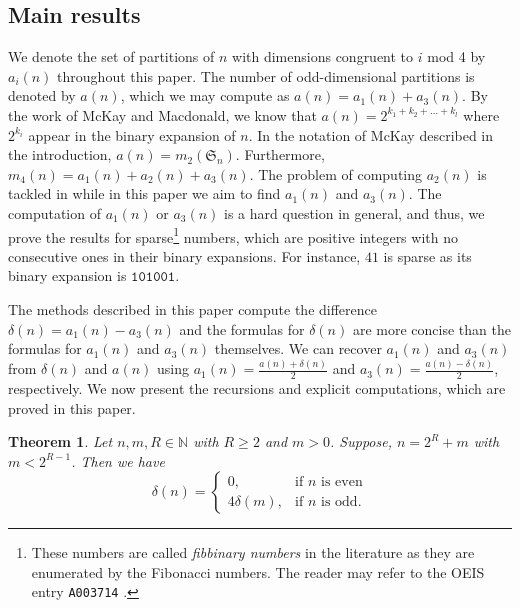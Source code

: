 \documentclass[12pt]{amsart}
\newtheorem{theorem}{Theorem}[section]
\theoremstyle{definition}
\numberwithin{equation}{section}
\renewcommand{\SS}{\mathfrak{S}}
\begin{document}

\subsection{Main results}\label{ssec:mainresults}
We denote the set of partitions of $n$ with dimensions congruent to $i$ mod 4 by $a_i(n)$ throughout this paper. The number of odd-dimensional partitions is denoted by $a(n)$, which we may compute as $a(n) = a_1(n) + a_3(n)$. By the work of McKay and Macdonald, we know that $a(n) = 2^{k_1 + k_2 + \ldots + k_l}$ where $2^{k_i}$ appear in the binary expansion of $n$. In the notation of McKay described in the introduction, $a(n)= m_2(\SS_n)$. Furthermore, $m_4(n) = a_1(n) + a_2(n) + a_3(n)$. The problem of computing $a_2(n)$ is tackled in \cite{khanna-2mod4} while in this paper we aim to find $a_1(n)$ and $a_3(n)$.
The computation of $a_1(n)$ or $a_3(n)$ is a hard question in general, and thus, we prove the results for sparse\footnote{These numbers are called \textit{fibbinary numbers} in the literature as they are enumerated by the Fibonacci numbers. The reader may refer to the OEIS entry \texttt{A003714} \cite{oeis}.} numbers, which are positive integers with no consecutive ones in their binary expansions. For instance, $41$ is sparse as its binary expansion is $\mathtt{101001}$.

The methods described in this paper compute the difference $\delta(n) = a_1(n) - a_3(n)$ and the formulas for $\delta(n)$ are more concise than the formulas for $a_1(n)$ and $a_3(n)$ themselves. We can recover $a_1(n)$ and $a_3(n)$ from $\delta(n)$ and $a(n)$ using $a_1(n) = \frac{a(n) + \delta(n)}{2}$ and $a_3(n) = \frac{a(n)-\delta(n)}{2}$, respectively. We now present the recursions and explicit computations, which are proved in this paper.
\begin{theorem}\label{mainthm}
Let $n, m, R \in \mathbb{N}$ with $R\geq 2$ and $m > 0$. Suppose, $n = 2^{R} + m$ with $m<2^{R-1}$. Then we have
\[
\delta(n) = \begin{cases}
0, & \text{if }n \text{ is even}\\
4 \delta(m), &\text{if } n \text{ is odd}.
\end{cases}
\]
\end{theorem}
\end{document}
